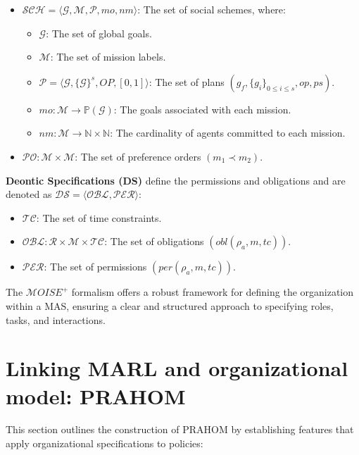 \documentclass[conference]{IEEEtran}
\begin{document}
\begin{itemize}
    \item $\mathcal{SCH} = \langle \mathcal{G}, \mathcal{M}, \mathcal{P}, mo, nm \rangle$: The set of social schemes, where:
    \begin{itemize}
        \item $\mathcal{G}$: The set of global goals.
        \item $\mathcal{M}$: The set of mission labels.
        \item $\mathcal{P} = \langle \mathcal{G}, \{\mathcal{G}\}^s, OP, [0,1] \rangle$: The set of plans $(g_f, \{g_i\}_{0 \leq i \leq s}, op, ps)$.
        \item $mo: \mathcal{M} \rightarrow \mathbb{P}(\mathcal{G})$: The goals associated with each mission.
        \item $nm: \mathcal{M} \rightarrow \mathbb{N} \times \mathbb{N}$: The cardinality of agents committed to each mission.
    \end{itemize}
    \item $\mathcal{PO}: \mathcal{M} \times \mathcal{M}$: The set of preference orders $(m_1 \prec m_2)$.
\end{itemize}

\textbf{Deontic Specifications (DS)} define the permissions and obligations and are denoted as $\mathcal{DS} = \langle \mathcal{OBL}, \mathcal{PER} \rangle$:

\begin{itemize}
    \item $\mathcal{TC}$: The set of time constraints.
    \item $\mathcal{OBL}: \mathcal{R} \times \mathcal{M} \times \mathcal{TC}$: The set of obligations $(obl(\rho_a, m, tc))$.
    \item $\mathcal{PER}$: The set of permissions $(per(\rho_a, m, tc))$.
\end{itemize}

The $\mathcal{M}OISE^+$ formalism offers a robust framework for defining the organization within a MAS, ensuring a clear and structured approach to specifying roles, tasks, and interactions.



\section{Linking MARL and organizational model: PRAHOM}

This section outlines the construction of PRAHOM by establishing features that apply organizational specifications to policies:
\end{document}
